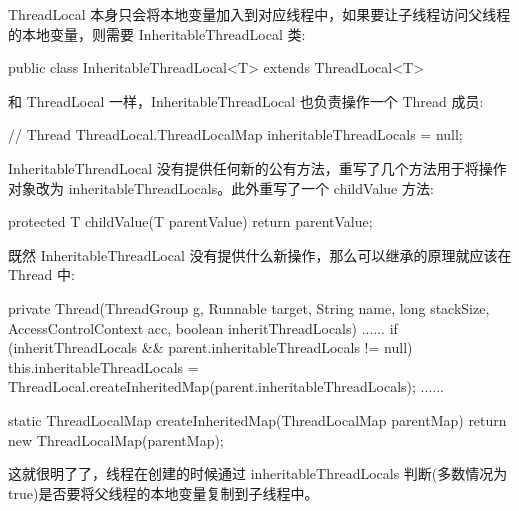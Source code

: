 ThreadLocal 本身只会将本地变量加入到对应线程中，如果要让子线程访问父线程的本地变量，则需要 InheritableThreadLocal 类:

\begin{Java}
public class InheritableThreadLocal<T> extends ThreadLocal<T>
\end{Java}

和 ThreadLocal 一样，InheritableThreadLocal 也负责操作一个 Thread 成员:

\begin{Java}
// Thread
ThreadLocal.ThreadLocalMap inheritableThreadLocals = null;
\end{Java}

InheritableThreadLocal 没有提供任何新的公有方法，重写了几个方法用于将操作对象改为 inheritableThreadLocals。此外重写了一个 childValue 方法:

\begin{Java}
protected T childValue(T parentValue) {
    return parentValue;
}
\end{Java}

既然 InheritableThreadLocal 没有提供什么新操作，那么可以继承的原理就应该在 Thread 中:

\begin{Java}
private Thread(ThreadGroup g, Runnable target, String name, long stackSize, AccessControlContext acc, boolean inheritThreadLocals) {
    ......
    if (inheritThreadLocals && parent.inheritableThreadLocals != null)
            this.inheritableThreadLocals = ThreadLocal.createInheritedMap(parent.inheritableThreadLocals);
    ......
}

static ThreadLocalMap createInheritedMap(ThreadLocalMap parentMap) {
    return new ThreadLocalMap(parentMap);
}
\end{Java}

这就很明了了，线程在创建的时候通过 inheritableThreadLocals 判断(多数情况为 true)是否要将父线程的本地变量复制到子线程中。

\newpage